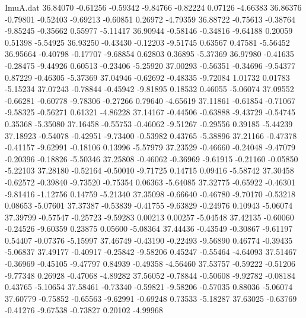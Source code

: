 \begin{filecontents}{ImuA.dat}
  36.84070   -0.61256   -0.59342   -9.84766   -0.82224    0.07126   -4.66383
  36.86376   -0.79801   -0.52403   -9.69213   -0.60851    0.26972   -4.79359
  36.88722   -0.75613   -0.38764   -9.85245   -0.35662    0.55977   -5.11417
  36.90944   -0.58146   -0.34816   -9.64188    0.20059    0.51398   -5.54925
  36.93250   -0.43430   -0.12203   -9.51745    0.63567    0.47581   -5.56452
  36.95664   -0.40798   -0.17707   -9.68854    0.62803    0.36895   -5.37369
  36.97980   -0.41635   -0.28475   -9.44926    0.60513   -0.23406   -5.25920
  37.00293   -0.56351   -0.34696   -9.54377    0.87229   -0.46305   -5.37369
  37.04946   -0.62692   -0.48335   -9.72084    1.01732    0.01783   -5.15234
  37.07243   -0.78844   -0.45942   -9.81895    0.18532    0.46055   -5.06074
  37.09552   -0.66281   -0.60778   -9.78306   -0.27266    0.79640   -4.65619
  37.11861   -0.61854   -0.71067   -9.58325   -0.56271    0.61321   -4.86228
  37.14167   -0.44506   -0.63888   -9.43729   -0.54745    0.35368   -5.35080
  37.16458   -0.55753   -0.46062   -9.51267   -0.29556    0.39185   -5.44239
  37.18923   -0.54078   -0.42951   -9.73400   -0.53982    0.43765   -5.38896
  37.21166   -0.47378   -0.41157   -9.62991   -0.18106    0.13996   -5.57979
  37.23529   -0.46660   -0.24048   -9.47079   -0.20396   -0.18826   -5.50346
  37.25808   -0.46062   -0.36969   -9.61915   -0.21160   -0.05850   -5.22103
  37.28180   -0.52164   -0.50010   -9.71725    0.14715    0.09416   -5.58742
  37.30458   -0.62572   -0.39840   -9.73520   -0.75354    0.06363   -5.64085
  37.32775   -0.65922   -0.46301   -9.81416   -1.12756    0.14759   -5.21340
  37.35098   -0.66640   -0.46780   -9.70170   -0.53218    0.08653   -5.07601
  37.37387   -0.53839   -0.41755   -9.63829   -0.24976    0.10943   -5.06074
  37.39799   -0.57547   -0.25723   -9.59283    0.00213    0.00257   -5.04548
  37.42135   -0.60060   -0.24526   -9.60359    0.23875    0.05600   -5.08364
  37.44436   -0.43549   -0.30867   -9.61197    0.54407   -0.07376   -5.15997
  37.46749   -0.43190   -0.22493   -9.56890    0.46774   -0.39435   -5.06837
  37.49177   -0.40917   -0.25842   -9.58206    0.45247   -0.55464   -4.64093
  37.51467   -0.36969   -0.45105   -9.47797    0.84939   -0.49358   -4.56460
  37.53757   -0.59222   -0.51206   -9.77348    0.26928   -0.47068   -4.89282
  37.56052   -0.78844   -0.50608   -9.92782   -0.08184    0.43765   -5.10654
  37.58461   -0.73340   -0.59821   -9.58206   -0.57035    0.88036   -5.06074
  37.60779   -0.75852   -0.65563   -9.62991   -0.69248    0.73533   -5.18287
  37.63025   -0.63769   -0.41276   -9.67538   -0.73827    0.20102   -4.99968

\end{filecontents}
